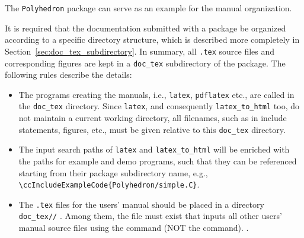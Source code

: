 The \texttt{Polyhedron} package can serve as an example for the manual
organization.

It is required that the documentation submitted with a package be organized
according to a specific directory structure, which is described more
completely in Section~\ref{sec:doc_tex_subdirectory}. In summary, all
{\tt .tex} source files and corresponding figures are kept in a 
\texttt{doc\_tex} subdirectory of the package. The following rules
describe the details:

\begin{itemize}  
   \item The programs creating the manuals, i.e., \texttt{latex},
         \texttt{pdflatex} etc., 
         are called in the \texttt{doc\_tex} directory. Since
         \texttt{latex}, and consequently \texttt{latex\_to\_html}
         too, do not maintain a current working directory, all
         filenames, such as in include statements, figures, etc., must
         be given relative to this \texttt{doc\_tex} directory.
   \item The input search paths of \texttt{latex} and
         \texttt{latex\_to\_html} will be enriched with the paths for
         example and demo programs, such that they can be referenced
         starting from their package subdirectory name, e.g., 
         \verb|\ccIncludeExampleCode{Polyhedron/simple.C}|.
   \item The {\tt .tex} files for the users' manual%
          should be placed in a 
         directory \verb|doc_tex/|\verb|/|%
         . Among
         them, the file 
         must exist that inputs all other users' 
         manual source files using the \verb|| command (NOT the
         \verb|| command).%
         .


\end{itemize}
